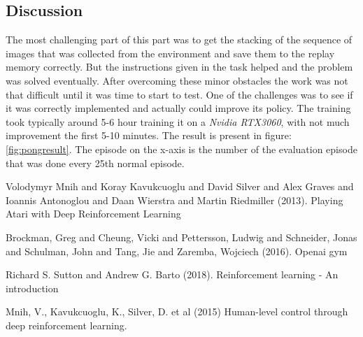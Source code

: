 \documentclass[a4paper,10pt]{article}
\begin{document}
\newpage 

\subsection*{Discussion}
The most challenging part of this part was to get the stacking of the sequence of images that was collected from the environment and save them to the replay memory correctly. But the instructions given in the task helped and the problem was solved eventually. After overcoming these minor obstacles the work was not that difficult until it was time to start to test. One of the challenges was to see if it was correctly implemented and actually could improve its policy. The training took typically around 5-6 hour training it on a \emph{Nvidia RTX3060}, with not much improvement the first 5-10 minutes. The result is present in figure: \ref{fig:pongresult}. The episode on the x-axis is the number of the evaluation episode that was done every 25th normal episode.   



\begin{thebibliography}{1}

 Volodymyr Mnih and Koray Kavukcuoglu and David Silver and Alex Graves and Ioannis Antonoglou and Daan Wierstra and Martin Riedmiller (2013). Playing Atari with Deep Reinforcement Learning

 Brockman, Greg and Cheung, Vicki and Pettersson, Ludwig and Schneider, Jonas and Schulman, John and Tang, Jie and Zaremba, Wojciech (2016). Openai gym

 Richard S. Sutton and Andrew G. Barto (2018). Reinforcement learning - An introduction

 Mnih, V., Kavukcuoglu, K., Silver, D. et al (2015) Human-level control through deep reinforcement learning.

\end{thebibliography}
\end{document}
